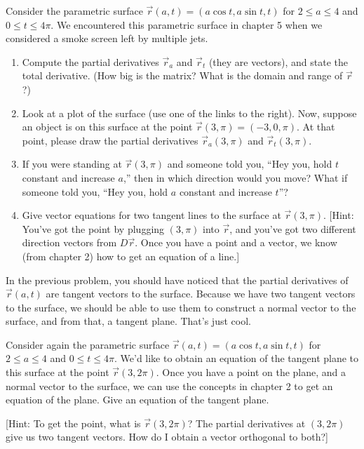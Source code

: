 \begin{problem}
 Consider the parametric surface $\vec r(a,t) = (a\cos t, a\sin t, t)$ for $2\leq a\leq 4$ and $0\leq t\leq 4\pi$. We encountered this parametric surface in chapter 5 when we considered a smoke screen left by multiple jets.
\begin{enumerate}
 \item Compute the partial derivatives $\vec r_a$ and $\vec r_t$ (they are vectors), and state the total derivative. (How big is the matrix? What is the domain and range of $\vec r$?)
 \item {}%
Look at a plot of the surface (use one of the links to the right). Now, suppose an object is on this surface at the point $\vec r(3,\pi) = (-3,0,\pi)$. At that point, please draw the partial derivatives $\vec r_a(3,\pi)$ and $\vec r_t(3,\pi)$.  
 \item If you were standing at $\vec r(3,\pi)$ and someone told you, ``Hey you, hold $t$ constant and increase $a$,'' then in which direction would you move? What if someone told you, ``Hey you, hold $a$ constant and increase $t$''?
 \item Give vector equations for two tangent lines to the surface at $\vec r(3,\pi)$.   [Hint: You've got the point by plugging $(3,\pi)$ into $\vec r$, and you've got two different direction vectors from $D\vec r$. Once you have a point and a vector, we know (from chapter 2) how to get an equation of a line.]
\end{enumerate}
  
\end{problem}

In the previous problem, you should have noticed that the partial derivatives of $\vec r(a,t)$ are tangent vectors to the surface. Because we have two tangent vectors to the surface, we should be able to use them to construct a normal vector to the surface, and from that, a tangent plane. That's just cool.

\begin{problem}
 Consider again the parametric surface $\vec r(a,t) = (a\cos t, a\sin t, t)$ for $2\leq a\leq 4$ and $0\leq t\leq 4\pi$. 
 We'd like to obtain an equation of the tangent plane to this surface at the point $\vec r(3,2\pi)$. Once you have a point on the plane, and a normal vector to the surface, we can use the concepts in chapter 2 to get an equation of the plane. Give an equation of the tangent plane.

 [Hint: To get the point, what is $\vec r(3,2\pi)$? The partial derivatives at $(3,2\pi)$ give us two tangent vectors.  How do I obtain a vector orthogonal to both?]
\end{problem}

